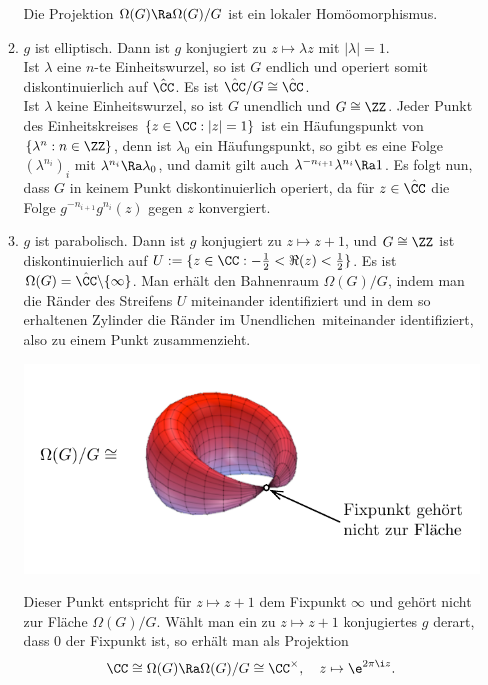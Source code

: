 \begin{enumerate}
\begin{enumerate}
\begin{center}
\end{center}
Die Projektion $\Omega(G)\Ra\Omega(G)/G$ ist ein
lokaler Homöomorphismus.
\item $g$ ist elliptisch.
Dann ist $g$ konjugiert zu $z\mapsto\lambda z$ mit $|\lambda|=1$.\\
Ist $\lambda$ eine $n$-te Einheitswurzel, so ist $G$ endlich und
operiert somit diskontinuierlich auf $\hat{\CC}$.
Es ist $\hat{\CC}/G\cong\hat{\CC}$.\\
Ist $\lambda$ keine Einheitswurzel, so ist $G$ unendlich und
$G\cong\ZZ$. Jeder Punkt des Einheitskreises $\{z\in\CC:|z|=1\}$
ist ein Häufungspunkt von $\{\lambda^n:n\in\ZZ\}$, denn ist
$\lambda_0$ ein Häufungspunkt, so gibt es eine Folge
$(\lambda^{n_i})_i$ mit $\lambda^{n_i}\Ra\lambda_0$,
und damit gilt auch $\lambda^{-n_{i+1}}\lambda^{n_i}\Ra 1$.
Es folgt nun, dass $G$ in keinem Punkt diskontinuierlich operiert,
da für $z\in\hat{\CC}$ die Folge $g^{-n_{i+1}}g^{n_i}(z)$ gegen
$z$ konvergiert.
\item $g$ ist parabolisch.
Dann ist $g$ konjugiert zu $z\mapsto z+1$, und $G\cong \ZZ$ ist
diskontinuierlich auf
$U:=\{z\in\CC:-\frac{1}{2}<\Re(z)<\frac{1}{2}\}$.
Es ist $\Omega(G)=\hat{\CC}\backslash\{\infty\}$.
Man erhält den Bahnenraum $\Omega(G)/G$, indem man die Ränder
des Streifens $U$ miteinander identifiziert und in dem so 
erhaltenen Zylinder die \glqq Ränder im Unendlichen\grqq\
miteinander identifiziert, also zu einem Punkt zusammenzieht.
\begin{center}
	\includegraphics{grugraImages/cuspTorus}
\end{center}
Dieser Punkt entspricht für $z\mapsto z+1$ dem Fixpunkt $\infty$
und gehört nicht zur Fläche $\Omega(G)/G$.
Wählt man ein zu $z\mapsto z+1$ konjugiertes $g$ derart, dass
$0$ der Fixpunkt ist, so erhält man als Projektion
\[
\CC\cong \Omega(G) \Ra \Omega(G)/G\cong \CC^\times,\quad
z\mapsto \e^{2\pi\i z}.
\]
\end{enumerate}

\end{enumerate}
